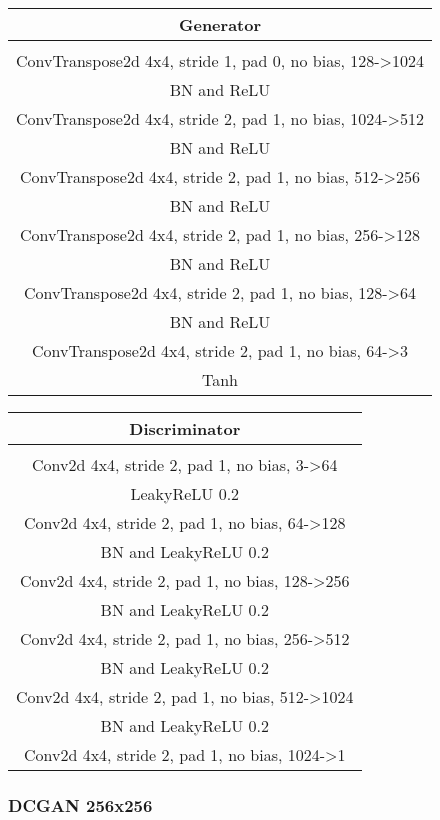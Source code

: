 \documentclass{article}
\begin{document}
\begin{tabular}{c}
	Generator \\
	\toprule\midrule
	 \\
	\midrule
	ConvTranspose2d 4x4, stride 1, pad 0, no bias, 128->1024 \\
	\midrule
	BN and ReLU \\
	\midrule
	ConvTranspose2d 4x4, stride 2, pad 1, no bias, 1024->512 \\
	\midrule
	BN and ReLU \\
	\midrule
	ConvTranspose2d 4x4, stride 2, pad 1, no bias, 512->256 \\
	\midrule
	BN and ReLU \\
	\midrule
	ConvTranspose2d 4x4, stride 2, pad 1, no bias, 256->128 \\
	\midrule
	BN and ReLU \\
	\midrule
	ConvTranspose2d 4x4, stride 2, pad 1, no bias, 128->64 \\
	\midrule
	BN and ReLU \\
	\midrule
	ConvTranspose2d 4x4, stride 2, pad 1, no bias, 64->3 \\
	\midrule
	Tanh \\
	\bottomrule
\end{tabular} 
\quad
\begin{tabular}{c}
	Discriminator \\
	\toprule\midrule
	 \\
	\midrule
	Conv2d 4x4, stride 2, pad 1, no bias, 3->64 \\
	\midrule
	LeakyReLU 0.2 \\
	\midrule
	Conv2d 4x4, stride 2, pad 1, no bias, 64->128 \\
	\midrule
	BN and LeakyReLU 0.2 \\
	\midrule
	Conv2d 4x4, stride 2, pad 1, no bias, 128->256 \\
	\midrule
	BN and LeakyReLU 0.2 \\
	\midrule
	Conv2d 4x4, stride 2, pad 1, no bias, 256->512 \\
	\midrule
	BN and LeakyReLU 0.2 \\
	\midrule
	Conv2d 4x4, stride 2, pad 1, no bias, 512->1024 \\
	\midrule
	BN and LeakyReLU 0.2 \\
	\midrule
	Conv2d 4x4, stride 2, pad 1, no bias, 1024->1 \\
	\bottomrule
\end{tabular}

\subsubsection{DCGAN 256x256}
\end{document}
